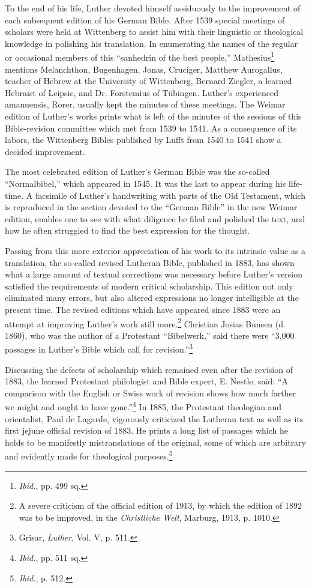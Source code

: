 To the end of his life, Luther devoted himself assiduously to the improvement
of each subsequent edition of his German Bible. After 1539 special
meetings of scholars were held at Wittenberg to assist him with their
linguistic or theological knowledge in polishing his translation. In enumerating
the names of the regular or occasional members of this “sanhedrin of the best
people,” Mathesius\footnote{\textit{Ibid.}, pp. 499 sq.}
 mentions Melanchthon, Bugenhagen, Jonas, Cruciger,
Matthew Aurogallus, teacher of Hebrew at the University of Wittenberg,
Bernard Ziegler, a learned Hebraist of Leipsic, and Dr. Forstemius of Tübingen.
Luther’s experienced amanuensis, Rorer, usually kept the minutes of these
meetings. The Weimar edition of Luther’s works prints what is left of the
minutes of the sessions of this Bible-revision committee which met from 1539
to 1541. As a consequence of its labors, the Wittenberg Bibles published by
Lufft from 1540 to 1541 show a decided improvement.

The most celebrated edition of Luther’s German Bible was the so-called
“Normalbibel,” which appeared in 1545. It was the last to
appear during his life-time. A facsimile of Luther’s handwriting
with parts of the Old Testament, which is reproduced in the section devoted
to the “German Bible” in the new Weimar edition,
enables one to see with what diligence he filed and polished the text,
and how he often struggled to find the best expression for the thought.

Passing from this more exterior appreciation of his work to its
intrinsic value as a translation, the so-called revised Lutheran Bible,
published in 1883, has shown what a large amount of textual corrections
was necessary before Luther’s version satisfied the requirements
of modern critical scholarship. This edition not only eliminated many
errors, but also altered expressions no longer intelligible at the present
time. The revised editions which have appeared since 1883 were an
attempt at improving Luther’s work still more.\footnote
{A severe criticism of the official edition of 1913, by which the edition of 1892 was to
be improved, in the \textit{Christliche Welt}, Marburg, 1913, p. 1010.}
Christian Josias
Bunsen (d. 1860), who was the author of a Protestant “Bibelwerk,”
said there were ``3,000 passages in Luther’s Bible which call for revision.”\footnote{Grisar, \textit{Luther}, Vol. V, p. 511.}

Discussing the defects of scholarship which remained even
after the revision of 1883, the learned Protestant philologist and
Bible expert, E. Nestle, said: “A comparison with the English or
Swiss work of revision shows how much farther we might and ought
to have gone.”\footnote{\textit{Ibid.}, pp. 511 sq.}
 In 1885, the Protestant theologian and orientalist,
Paul de Lagarde, vigorously criticized the Lutheran text as well as
its first jejune official revision of 1883. He prints a long list of passages
which he holds to be manifestly mistranslations of the original,
some of which are arbitrary and evidently made for theological purposes.\footnote{\textit{Ibid.}, p. 512.}


